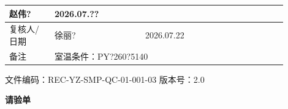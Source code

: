 \documentclass[UTF8,10pt,a4paper,fontset=fandol]{ctexart}
\newcommand{\fieldvalue}[1]{#1}
\newcommand{\handwritten}[1]{#1}
\begin{document}
\begin{tabular}{|p{0.15\linewidth}|p{0.30\linewidth}|p{0.15\linewidth}|p{0.30\linewidth}|}
\fieldvalue{\handwritten{赵伟?}} &
\fieldvalue{\handwritten{2026.07.??}}
\\
\hline
复核人/日期 &
\fieldvalue{\handwritten{徐丽?}} &
\fieldvalue{\handwritten{2026.07.22}}
\\
\hline
备注 &
\multicolumn{3}{l|}{
\fieldvalue{\handwritten{室温条件：PY?260?5140}}}
\\
\hline
\end{tabular}


\newpage

\begin{center}
文件编码：REC-YZ-SMP-QC-01-001-03 \qquad 版本号：2.0

\textbf{请验单}
\end{center}
\end{document}
